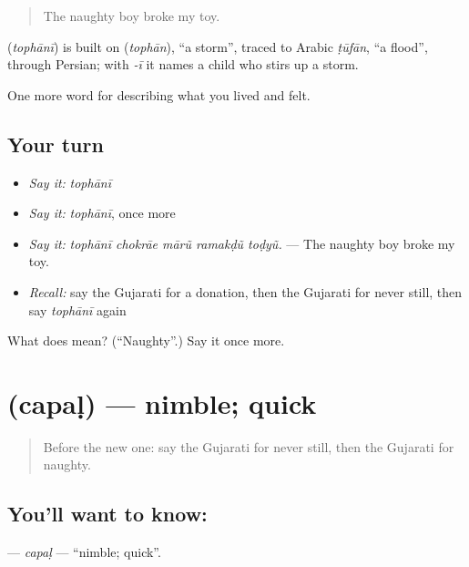 \begin{quote}
The naughty boy broke my toy.
\end{quote}

\begin{cousinweb}
\textbf{} (\emph{tophānī}) is built on \textbf{} (\emph{tophān}), \textquotedblleft{}a storm\textquotedblright{}, traced to Arabic \emph{ṭūfān}, \textquotedblleft{}a flood\textquotedblright{}, through Persian; with \emph{-ī} it names a child who stirs up a storm.
\end{cousinweb}

\begin{grammarlens}[title={What you've built}]
One more word for describing what you lived and felt.
\end{grammarlens}

\subsection*{Your turn}
\begin{itemize}
\raggedright
  \item \emph{Say it:} \emph{tophānī}
  \item \emph{Say it:} \emph{tophānī}, once more
  \item \emph{Say it:} \emph{tophānī chokrāe mārũ ramakḍũ toḍyũ.} — The naughty boy broke my toy.
  \item \emph{Recall:} say the Gujarati for a donation, then the Gujarati for never still, then say \emph{tophānī} again
\end{itemize}

\begin{tcolorbox}[breakable,colback=teal!4,colframe=teal!35!black,title={Before you move on}]
What does  mean? (\textquotedblleft{}Naughty\textquotedblright{}.) Say it once more.
\end{tcolorbox}
\section[\texorpdfstring{\gu{ચપળ} (capaḷ)}{ચપળ (capaḷ)}]{ (capaḷ) — nimble; quick}

\label{lesson:GU-C462-capal}



\begin{quote}
Before the new one: say the Gujarati for never still, then the Gujarati for naughty.
\end{quote}

\subsection*{You'll want to know: }
\textbf{} — \emph{capaḷ} — \textquotedblleft{}nimble; quick\textquotedblright{}.

